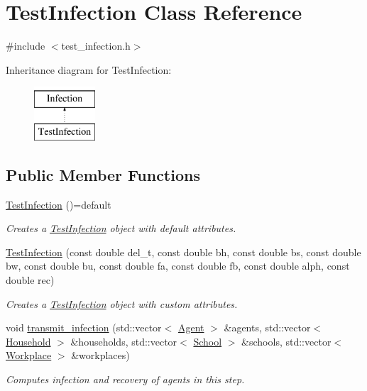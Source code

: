 \hypertarget{classTestInfection}{}\section{Test\+Infection Class Reference}
\label{classTestInfection}


{\ttfamily \#include $<$test\+\_\+infection.\+h$>$}

Inheritance diagram for Test\+Infection\+:\begin{figure}[H]
\begin{center}
\leavevmode
\includegraphics[height=2.000000cm]{classTestInfection}
\end{center}
\end{figure}
\subsection*{Public Member Functions}
\begin{DoxyCompactItemize}
\item 
\hyperlink{classTestInfection_abda0511d1b6a0b63d7dec65857201c7a}{Test\+Infection} ()=default
\begin{DoxyCompactList}\small\item\em Creates a \hyperlink{classTestInfection}{Test\+Infection} object with default attributes. \end{DoxyCompactList}\item 
\hyperlink{classTestInfection_a95e12afdd2b23350b7453c5b81d63720}{Test\+Infection} (const double del\+\_\+t, const double bh, const double bs, const double bw, const double bu, const double fa, const double fb, const double alph, const double rec)
\begin{DoxyCompactList}\small\item\em Creates a \hyperlink{classTestInfection}{Test\+Infection} object with custom attributes. \end{DoxyCompactList}\item 
void \hyperlink{classTestInfection_a78821345a56ae8821615a8b1ac1f3dec}{transmit\+\_\+infection} (std\+::vector$<$ \hyperlink{classAgent}{Agent} $>$ \&agents, std\+::vector$<$ \hyperlink{classHousehold}{Household} $>$ \&households, std\+::vector$<$ \hyperlink{classSchool}{School} $>$ \&schools, std\+::vector$<$ \hyperlink{classWorkplace}{Workplace} $>$ \&workplaces)
\begin{DoxyCompactList}\small\item\em Computes infection and recovery of agents in this step. \end{DoxyCompactList}\end{DoxyCompactItemize}


